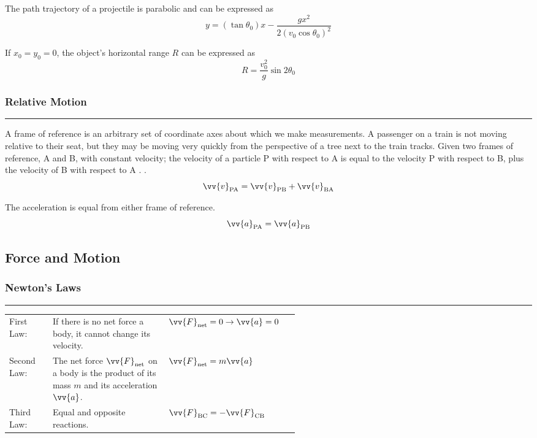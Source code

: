 \documentclass{article}
\begin{document}
    \vspace{1.2em}
    \smallskip\noindent
    The path trajectory of a projectile is parabolic and can be expressed as
    \[
        y=\left(\tan\theta_0\right)x-\frac{gx^2}{2\left(v_0\cos\theta_0\right)^2}
    \]

    \smallskip\noindent
    If $x_0 = y_0 = 0$, the object's horizontal range $R$ can be expressed as
    \[
        R = \frac{v_0^2}{g}\sin2\theta_0
    \]

    \smallskip
    \subsubsection*{Relative Motion}
    \vspace{-1em}
    \rule{\linewidth}{.1mm}

    \smallskip\noindent
    A frame of reference is an arbitrary set of coordinate axes about which we make measurements.
    A passenger on a train is not moving relative to their seat, but they may be moving very quickly from the perspective of a tree next to the train tracks.
    Given two frames of reference, A and B, with constant velocity; the velocity of a particle P with respect to A is equal to the velocity P with respect to B, plus the velocity of B with respect to A .
    \@.   \[
              \vv{v}_{\text{PA}} = \vv{v}_{\text{PB}} + \vv{v}_{\text{BA}}
    \]

    \smallskip\noindent
    The acceleration is equal from either frame of reference.
    \[
        \vv{a}_{\text{PA}} = \vv{a}_{\text{PB}}
    \]

    \begin{center}
        \subsection*{Force and Motion}
    \end{center}

    \medskip
    \subsubsection*{Newton's Laws}
    \vspace{-1em}
    \rule{\linewidth}{.1mm}

    \medskip
    \renewcommand{\arraystretch}{1.3}
    \begin{tabular}{p{0.15\linewidth} p{0.4\linewidth} p{.3\linewidth}}
        First Law:
        & If there is no net force a body, it cannot change its velocity.
        & $\vv{F}_{\text{net}} = 0 \rightarrow \vv{a}=0$ \\
        Second Law:
        & The net force $\vv{F}_{\text{net}}$ on a body is the product of its mass $m$ and its acceleration $\vv{a}$.
        &$\vv{F}_{\text{net}} = m\vv{a}$\\
        Third Law:
        & Equal and opposite reactions.
        &$\vv{F}_{\text{BC}} = - \vv{F}_{\text{CB}}$
    \end{tabular}
\end{document}
